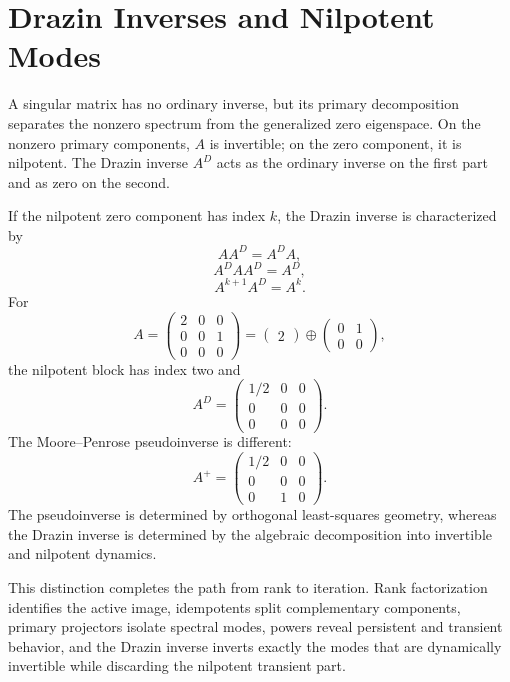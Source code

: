 \section{Drazin Inverses and Nilpotent Modes}

A singular matrix has no ordinary inverse, but its primary decomposition separates the nonzero spectrum from the generalized zero eigenspace.  On the nonzero primary components, \(A\) is invertible; on the zero component, it is nilpotent.  The Drazin inverse \(A^D\) acts as the ordinary inverse on the first part and as zero on the second.

If the nilpotent zero component has index \(k\), the Drazin inverse is characterized by
\[
  AA^D=A^DA,
\]
\[
  A^DAA^D=A^D,
\]
\[
  A^{k+1}A^D=A^k.
\]
For
\[
  A=
  \begin{pmatrix}
    2&0&0\\
    0&0&1\\
    0&0&0
  \end{pmatrix}
  =
  \begin{pmatrix}2\end{pmatrix}
  \oplus
  \begin{pmatrix}0&1\\0&0\end{pmatrix},
\]
the nilpotent block has index two and
\[
  A^D=
  \begin{pmatrix}
    1/2&0&0\\
    0&0&0\\
    0&0&0
  \end{pmatrix}.
\]
The Moore--Penrose pseudoinverse is different:
\[
  A^+=
  \begin{pmatrix}
    1/2&0&0\\
    0&0&0\\
    0&1&0
  \end{pmatrix}.
\]
The pseudoinverse is determined by orthogonal least-squares geometry, whereas the Drazin inverse is determined by the algebraic decomposition into invertible and nilpotent dynamics.

This distinction completes the path from rank to iteration.  Rank factorization identifies the active image, idempotents split complementary components, primary projectors isolate spectral modes, powers reveal persistent and transient behavior, and the Drazin inverse inverts exactly the modes that are dynamically invertible while discarding the nilpotent transient part.